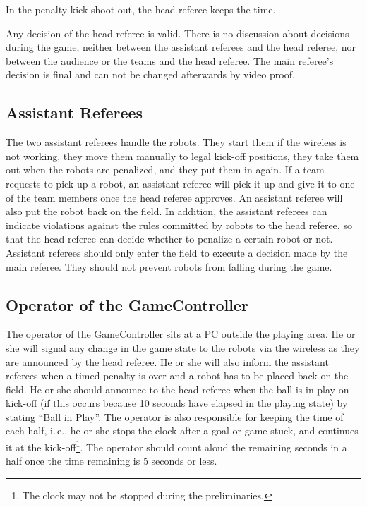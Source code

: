 \documentclass[12pt]{article}
\newcommand{\ie}{\mbox{i.\,e.}\xspace}
\begin{document}
In the penalty kick shoot-out, the head referee keeps the time.

Any decision of the head referee is valid. There is no discussion about decisions during the game, neither between the assistant referees and the head referee, nor between the audience or the teams and the head referee. The main referee's decision is final and can not be changed afterwards by video proof.

\subsection{Assistant Referees}

The two assistant referees handle the robots. They start them if the wireless is not working, they move them manually to legal kick-off positions, they take them out when the robots are penalized, and they put them in again. If a team requests to pick up a robot, an assistant referee will pick it up and give it to one of the team members once the head referee approves. An assistant referee will also put the robot back on the field. In addition, the assistant referees can indicate violations against the rules committed by robots to the head referee, so that the head referee can decide whether to penalize a certain robot or not. Assistant referees should only enter the field to execute a decision made by the main referee. They should not prevent robots from falling during the game.

\subsection{Operator of the GameController}
\label{sec:gameControllerOp}
The operator of the GameController sits at a PC outside the playing area. He or she will signal any change in the game state to the robots via the wireless as they are announced by the head referee. He or she will also inform the assistant referees when a timed penalty is over and a robot has to be placed back on the field. He or she should announce to the head referee when the ball is in play on kick-off (if this occurs because 10 seconds have elapsed in the playing state) by stating ``Ball in Play''. The operator is also responsible for keeping the time of each half, \ie, he or she stops the clock after a goal or game stuck, and continues it at the kick-off\footnote{The clock may not be stopped during the preliminaries.}.  The operator should count aloud the remaining seconds in a half once the time remaining is 5 seconds or less.
\end{document}
